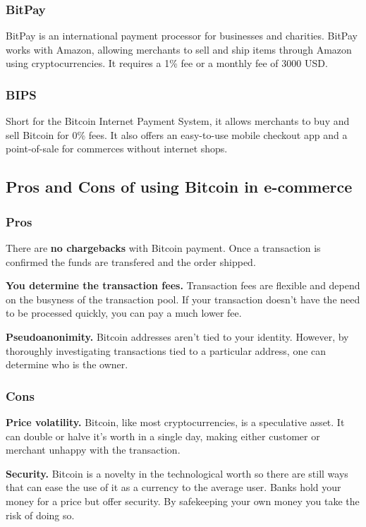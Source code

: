 \documentclass{ferseminar}
\begin{document}
\subsubsection{BitPay}
BitPay is an international payment processor for businesses and charities. BitPay works with Amazon, allowing merchants to sell and ship items through Amazon using cryptocurrencies. It requires a 1\% fee or a monthly fee of 3000 USD.
\subsubsection{BIPS}
Short for the Bitcoin Internet Payment System, it allows merchants to buy and sell Bitcoin for 0\% fees. It also offers an easy-to-use mobile checkout app and a point-of-sale for commerces without internet shops.
\subsection{Pros and Cons of using Bitcoin in e-commerce}
\subsubsection{Pros}
There are \textbf{no chargebacks} with Bitcoin payment. Once a transaction is confirmed the funds are transfered and the order shipped.

\textbf{You determine the transaction fees.} Transaction fees are flexible and depend on the busyness of the transaction pool. If your transaction doesn't have the need to be processed quickly, you can pay a much lower fee.

\textbf{Pseudoanonimity.} Bitcoin addresses aren't tied to your identity. However, by thoroughly investigating transactions tied to a particular address, one can determine who is the owner.

\subsubsection{Cons}
\textbf{Price volatility.} Bitcoin, like most cryptocurrencies, is a speculative asset. It can double or halve it's worth in a single day, making either customer or merchant unhappy with the transaction.

\textbf{Security.} Bitcoin is a novelty in the technological worth so there are still ways that can ease the use of it as a currency to the average user. Banks hold your money for a price but offer security. By safekeeping your own money you take the risk of doing so. 
\end{document}

